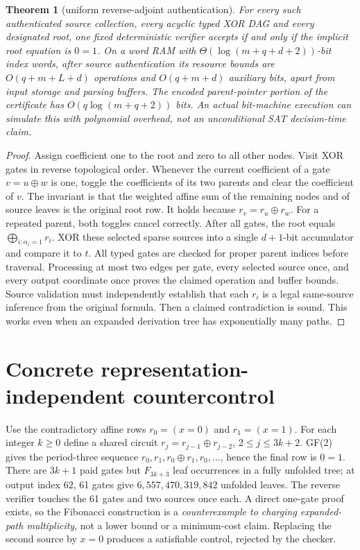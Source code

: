 \documentclass[11pt]{article}
\newtheorem{theorem}{Theorem}
\begin{document}
\begin{theorem}[uniform reverse-adjoint authentication]
For every such authenticated source collection, every acyclic typed XOR DAG and every designated root, one fixed deterministic verifier accepts if and only if the implicit root equation is \(0=1\). On a word RAM with \(\Theta(\log(m+q+d+2))\)-bit index words, after source authentication its resource bounds are \(O(q+m+L+d)\) operations and \(O(q+m+d)\) auxiliary bits, apart from input storage and parsing buffers. The encoded parent-pointer portion of the certificate has \(O(q\log(m+q+2))\) bits. An actual bit-machine execution can simulate this with polynomial overhead, not an unconditional SAT decision-time claim.
\end{theorem}
\begin{proof}
Assign coefficient one to the root and zero to all other nodes. Visit XOR gates in reverse topological order. Whenever the current coefficient of a gate \(v=u\oplus w\) is one, toggle the coefficients of its two parents and clear the coefficient of \(v\). The invariant is that the weighted affine sum of the remaining nodes and of source leaves is the original root row. It holds because \(r_v=r_u\oplus r_w\). For a repeated parent, both toggles cancel correctly. After all gates, the root equals \(\bigoplus_{i:\alpha_i=1}r_i\). XOR these selected sparse sources into a single \(d+1\)-bit accumulator and compare it to \(t\). All typed gates are checked for proper parent indices before traversal. Processing at most two edges per gate, every selected source once, and every output coordinate once proves the claimed operation and buffer bounds. Source validation must independently establish that each \(r_i\) is a legal same-source inference from the original formula. Then a claimed contradiction is sound. This works even when an expanded derivation tree has exponentially many paths.
\end{proof}

\section*{Concrete representation-independent countercontrol}
Use the contradictory affine rows \(r_0=(x=0)\) and \(r_1=(x=1)\). For each integer \(k\ge0\) define a shared circuit \(r_j=r_{j-1}\oplus r_{j-2}\), \(2\le j\le3k+2\). GF(2) gives the period-three sequence \(r_0,r_1,r_0\oplus r_1,r_0,\ldots\), hence the final row is \(0=1\). There are \(3k+1\) paid gates but \(F_{3k+3}\) leaf occurrences in a fully unfolded tree; at output index \(62\), 61 gates give \(6{,}557{,}470{,}319{,}842\) unfolded leaves. The reverse verifier touches the 61 gates and two sources once each. A direct one-gate proof exists, so the Fibonacci construction is a \emph{counterexample to charging expanded-path multiplicity}, not a lower bound or a minimum-cost claim. Replacing the second source by \(x=0\) produces a satisfiable control, rejected by the checker.
\end{document}
